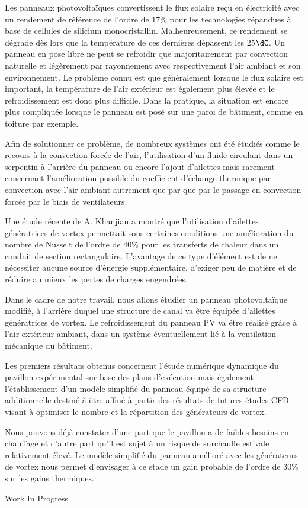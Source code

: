{\normalsize
Les panneaux photovoltaïques convertissent le flux solaire reçu en électricité avec un rendement de référence de l'ordre de 17\% pour les technologies répandues à base de cellules de silicium monocristallin. Malheureusement, ce rendement se dégrade dès lors que la température de ces dernières dépassent les 25$\dC$. Un panneau en pose libre ne peut se refroidir que majoritairement par convection naturelle et légèrement par rayonnement avec respectivement l'air ambiant et son environnement. Le problème connu est que généralement lorsque le flux solaire est important, la température de l'air extérieur est également plus élevée et le refroidissement est donc plus difficile. Dans la pratique, la situation est encore plus compliquée lorsque le panneau est posé sur une paroi de bâtiment, comme en toiture par exemple.



Afin de solutionner ce problème, de nombreux systèmes ont été étudiés comme le recours à la convection forcée de l'air, l'utilisation d'un fluide circulant dans un serpentin à l'arrière du panneau ou encore l'ajout d'ailettes mais rarement concernant l'amélioration possible du coefficient d'échange thermique par convection avec l'air ambiant autrement que par que par le passage en convection forcée par le biais de ventilateurs. 



Une étude récente de A. Khanjian a montré que l'utilisation d'ailettes génératrices de vortex permettait sous certaines conditions une amélioration du nombre de Nusselt de l'ordre de 40\% pour les transferts de chaleur dans un conduit de section rectangulaire. L'avantage de ce type d'élément est de ne nécessiter aucune source d'énergie supplémentaire, d'exiger peu de matière et de réduire au mieux les pertes de charges engendrées.



Dans le cadre de notre travail, nous allons étudier un panneau photovoltaïque modifié, à l'arrière duquel une structure de canal va être équipée d'ailettes génératrices de vortex. Le refroidissement du panneau PV va être réalisé grâce à l'air extérieur ambiant, dans un système éventuellement lié à la ventilation mécanique du bâtiment. 



Les premiers résultats obtenus concernent l'étude numérique dynamique du pavillon expérimental sur base des plans d'exécution mais également l'établissement d'un modèle simplifié du panneau équipé de sa structure additionnelle destiné à être affiné à partir des résultats de futures études CFD visant à optimiser le nombre et la répartition des générateurs de vortex.



Nous pouvons déjà constater d'une part que le pavillon a de faibles besoins en chauffage et d'autre part qu'il est sujet à un risque de surchauffe estivale relativement élevé. Le modèle simplifié du panneau amélioré avec les générateurs de vortex nous permet d'envisager à ce stade un gain probable de l'ordre de 30\% sur les gains thermiques.

 \vfill Work In Progress

}
 
